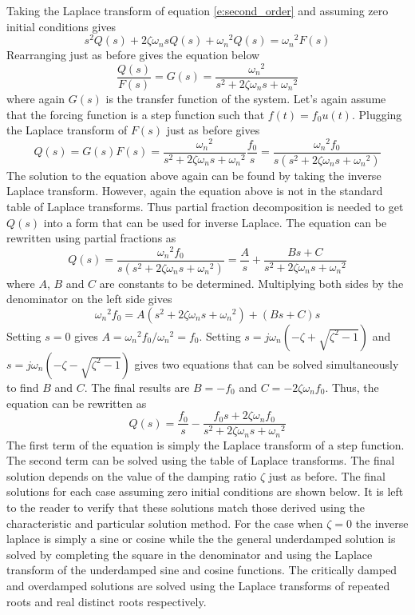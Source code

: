 Taking the Laplace transform of equation \ref{e:second_order} and assuming zero initial conditions gives
\begin{equation}
    s^2 Q(s) + 2\zeta \omega_n s Q(s) + {\omega_n}^2 Q(s) = {\omega_n}^2 F(s)
\end{equation}
Rearranging just as before gives the equation below 
\begin{equation}
    \frac{Q(s)}{F(s)} = G(s) = \frac{{\omega_n}^2}{s^2 + 2\zeta \omega_n s + {\omega_n}^2}
\end{equation}
where again $G(s)$ is the transfer function of the system. Let's again assume that the forcing function is a step function such that $f(t)=f_0u(t)$. Plugging the Laplace transform of $F(s)$ just as before gives
\begin{equation}
    Q(s) = G(s)F(s) = \frac{{\omega_n}^2}{s^2 + 2\zeta \omega_n s + {\omega_n}^2}\frac{f_0}{s} = \frac{{\omega_n}^2 f_0}{s(s^2 + 2\zeta \omega_n s + {\omega_n}^2)}
\end{equation}
The solution to the equation above again can be found by taking the inverse Laplace transform. However, again the equation above is not in the standard table of Laplace transforms. Thus partial fraction decomposition is needed to get $Q(s)$ into a form that can be used for inverse Laplace. The equation can be rewritten using partial fractions as
\begin{equation}
    Q(s) = \frac{{\omega_n}^2 f_0}{s(s^2 + 2\zeta \omega_n s + {\omega_n}^2)} = \frac{A}{s} + \frac{Bs + C}{s^2 + 2\zeta \omega_n s + {\omega_n}^2}
\end{equation}
where $A$, $B$ and $C$ are constants to be determined. Multiplying both sides by the denominator on the left side gives
\begin{equation}
    {\omega_n}^2 f_0 = A(s^2 + 2\zeta \omega_n s + {\omega_n}^2) + (Bs + C)s
\end{equation}
Setting $s=0$ gives $A={\omega_n}^2 f_0/{\omega_n}^2 = f_0$. Setting $s=j\omega_n(-\zeta + \sqrt{\zeta^2 - 1})$ and $s=j\omega_n(-\zeta - \sqrt{\zeta^2 - 1})$ gives two equations that can be solved simultaneously to find $B$ and $C$. The final results are $B=-f_0$ and $C=-2\zeta \omega_n f_0$. Thus, the equation can be rewritten as
\begin{equation}
    Q(s) = \frac{f_0}{s} - \frac{f_0 s + 2\zeta \omega_n f_0}{s^2 + 2\zeta \omega_n s + {\omega_n}^2}
\end{equation}
The first term of the equation is simply the Laplace transform of a step function. The second term can be solved using the table of Laplace transforms. The final solution depends on the value of the damping ratio $\zeta$ just as before. The final solutions for each case assuming zero initial conditions are shown below. It is left to the reader to verify that these solutions match those derived using the characteristic and particular solution method. For the case when $\zeta=0$ the inverse laplace is simply a sine or cosine while the the general underdamped solution is solved by completing the square in the denominator and using the Laplace transform of the underdamped sine and cosine functions. The critically damped and overdamped solutions are solved using the Laplace transforms of repeated roots and real distinct roots respectively.
